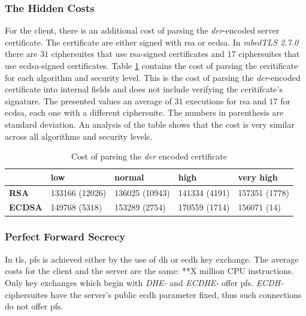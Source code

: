 \documentclass{llncs}
\begin{document}
\subsubsection{The Hidden Costs}


For the client, there is an additional cost of parsing the \textit{der}-encoded server certificate. The certificate are either signed with
\gls{rsa} or \gls{ecdsa}. In \textit{mbedTLS 2.7.0} there are $31$ ciphersuites that use \gls{rsa}-signed certificates and $17$ ciphersuites
that use \gls{ecdsa}-signed certificates. Table \ref{table:cert-parse-cost} contains the cost of parsing the ceritificate for each algorithm
and security level. This is the cost of parsing the \textit{der}-encoded certificate into internal fields and does not include verifying 
the ceritifcate's signature. The presented values an average of $31$ executions for \gls{rsa} and $17$ for \gls{ecdsa}, each one with a 
different ciphersuite. The numbers in parenthesis are standard deviation. An analysis of the table shows that the cost is very similar across all
algorithms and security levels.

\begin{table}[]
\label{table:cert-parse-cost}
\begin{tabular}{|l|l|l|l|l|}
\hline
               & \textbf{low}   & \textbf{normal} & \textbf{high} & \textbf{very high} \\ \hline
\textbf{RSA}   & 133166 (12026) & 136025 (10943)  & 141334 (4191) & 157351 (1778)      \\ \hline
\textbf{ECDSA} & 149768 (5318)  & 153289 (2754)   & 170559 (1714) & 156071 (14)        \\ \hline
\end{tabular}
\caption{Cost of parsing the \textit{der} encoded certificate}
\end{table}

\subsubsection{Perfect Forward Secrecy}

In \gls{tls}, \gls{pfs} is achieved either by the use of \gls{dh} or \gls{ecdh} key exchange. The average costs for the
client and the server are the same: **X million CPU instructions. Only key exchanges which begin with \textit{DHE-} and
\textit{ECDHE-} offer \gls{pfs}. \textit{ECDH-} ciphersuites have the server's public \gls{ecdh} parameter fixed, thus
such connections do not offer \gls{pfs}.
\end{document}
